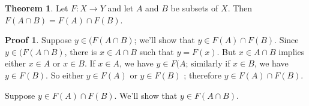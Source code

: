 \documentclass[fleqn]{beamer}
\theoremstyle{definition}
\newtheorem{myth}{Theorem}
\newtheorem{myproof}{Proof}
\begin{document}
\begin{frame}

\begin{myth}  Let \(F : X \to Y\) and let \(A\) and \(B\) be subsets of \(X\).  Then  \(F(A \cap B) = F(A) \cap F(B) \).
\end{myth}

\begin{myproof}  Suppose \(y \in (F(A \cap B)\); we'll show that \(y \in F(A) \cap F(B) \).   Since \(y \in (F(A \cap B)\), there is
\(x \in A \cap B\) such that \(y = F(x)\).  But \(x \in A \cap B\) implies either \(x \in A\) or \(x \in B\).  If \(x \in A\), we have \(y \in F(A\); similarly if \(x \in B\), we have \(y \in F(B)\). So
either \(y \in F(A)\) or \(y \in F(B)\) ; therefore  \(y \in F(A) \cap F(B) \).  

 \quad Suppose  \(y \in F(A) \cap F(B) \).  We'll show that \(y \in F(A \cap B)\).


\end{myproof}  



\end{frame}
\end{document}
